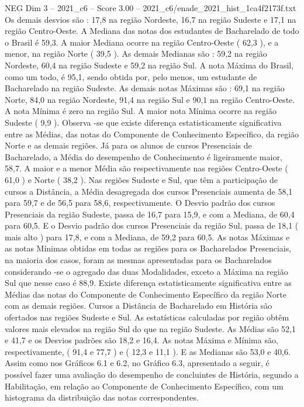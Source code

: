 \begin{textsample}{NEG Dim 3 – 2021\_c6 – Score 3.00 – 2021\_c6/enade\_2021\_hist\_1ca4f2173f.txt}
Os demais desvios são : 17,8 na região Nordeste, 16,7 na região Sudeste e 17,1 na região Centro-Oeste.
A Mediana das notas dos estudantes de Bacharelado de todo o Brasil é 59,3.
A maior Mediana ocorre na região Centro-Oeste ( 62,3 ), e a menor, na região Norte ( 39,5 ).
As demais Medianas são : 59,2 na região Nordeste, 60,4 na região Sudeste e 59,2 na região Sul.
A nota Máxima do Brasil, como um todo, é 95,1, sendo obtida por, pelo menos, um estudante de Bacharelado na região Sudeste.
As demais notas Máximas são : 69,1 na região Norte, 84,0 na região Nordeste, 91,4 na região Sul e 90,1 na região Centro-Oeste.
A nota Mínima é zero na região Sul.
A maior nota Mínima ocorre na região Sudeste ( 9,9 ).
Observa -se que existe diferença estatisticamente significativa entre as Médias, das notas do Componente de Conhecimento Específico, da região Norte e as demais regiões.
Já para os alunos de cursos Presenciais de Bacharelado, a Média do desempenho de Conhecimento é ligeiramente maior, 58,7.
A maior e a menor Média são respectivamente nas regiões Centro-Oeste ( 61,0 ) e Norte ( 38,2 ).
Nas regiões Sudeste e Sul, que têm a participação de cursos a Distância, a Média desagregada dos cursos Presenciais aumenta de 58,1 para 59,7 e de 56,5 para 58,6, respectivamente.
O Desvio padrão dos cursos Presenciais da região Sudeste, passa de 16,7 para 15,9, e com a Mediana, de 60,4 para 60,5.
E o Desvio padrão dos cursos Presenciais da região Sul, passa de 18,1 ( mais alto ) para 17,8, e com a Mediana, de 59,2 para 60,5.
As notas Máximas e as notas Mínimas obtidas em todas as regiões para os Bacharelados Presenciais, na maioria dos casos, foram as mesmas apresentadas para os Bacharelados considerando -se o agregado das duas Modalidades, exceto a Máxima na região Sul que nesse caso é 88,9.
Existe diferença estatisticamente significativa entre as Médias das notas do Componente de Conhecimento Específico da região Norte com as demais regiões.
Cursos a Distância de Bacharelado em História são ofertados nas regiões Sudeste e Sul.
As estatísticas calculadas por região obtêm valores mais elevados na região Sul do que na região Sudeste.
As Médias são 52,1 e 41,7 e os Desvios padrões são 18,2 e 16,4.
As notas Máxima e Mínima são, respectivamente, ( 91,4 e 77,7 ) e ( 12,3 e 11,1 ).
E as Medianas são 53,0 e 40,6.
Assim como nos Gráficos 6.1 e 6.2, no Gráfico 6.3, apresentado a seguir, é possível fazer uma avaliação do desempenho de concluintes de História, segundo a Habilitação, em relação ao Componente de Conhecimento Específico, com um histograma da distribuição das notas correspondentes.

\end{textsample}
